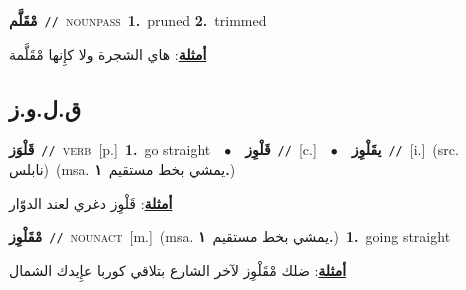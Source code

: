 \documentclass[10pt,a4paper,twoside]{article} %
\begin{document}
\begin{multicols}{2}
{\setlength\topsep{0pt}\textbf{\foreignlanguage{arabic}{مْقَلَّم}}\ {\color{gray}\texttt{//}\color{black}}\ \textsc{noun\textunderscore pass}\ \textbf{1.}~pruned  \textbf{2.}~trimmed\  \begin{flushright}\color{gray}\foreignlanguage{arabic}{\textbf{\underline{\foreignlanguage{arabic}{أمثلة}}}: هاي الشجرة ولا كإِنها مْقَلَّمة}\end{flushright}\color{black}} \vspace{2mm}

\vspace{-3mm}
\subsection*{\color{blue}\foreignlanguage{arabic}{ق.ل.و.ز}\color{blue}{}} 

{\setlength\topsep{0pt}\textbf{\foreignlanguage{arabic}{قَلْوَز}}\ {\color{gray}\texttt{//}\color{black}}\ \textsc{verb}\ [p.]\ \textbf{1.}~go straight\ \ $\bullet$\ \ \setlength\topsep{0pt}\textbf{\foreignlanguage{arabic}{قَلْوِز}}\ {\color{gray}\texttt{//}\color{black}}\ [c.]\ \ $\bullet$\ \ \setlength\topsep{0pt}\textbf{\foreignlanguage{arabic}{يقَلْوِز}}\ {\color{gray}\texttt{//}\color{black}}\ [i.]\ (src. \color{gray}\foreignlanguage{arabic}{نابلس}\color{black})\ \color{gray}(msa. \foreignlanguage{arabic}{يمشي بخط مستقيم}~\foreignlanguage{arabic}{\textbf{١.}})\color{black}\  \begin{flushright}\color{gray}\foreignlanguage{arabic}{\textbf{\underline{\foreignlanguage{arabic}{أمثلة}}}: قَلْوِز دغري لعند الدوّار}\end{flushright}\color{black}} \vspace{2mm}

{\setlength\topsep{0pt}\textbf{\foreignlanguage{arabic}{مْقَلْوِز}}\ {\color{gray}\texttt{//}\color{black}}\ \textsc{noun\textunderscore act}\ [m.]\ \color{gray}(msa. \foreignlanguage{arabic}{يمشي بخط مستقيم}~\foreignlanguage{arabic}{\textbf{١.}})\color{black}\ \textbf{1.}~going straight\  \begin{flushright}\color{gray}\foreignlanguage{arabic}{\textbf{\underline{\foreignlanguage{arabic}{أمثلة}}}: ضلك مْقَلْوِز لآخر الشارع بتلاقي كوربا عإِيدك الشمال}\end{flushright}\color{black}} \vspace{2mm}


\end{multicols}
\end{document}
